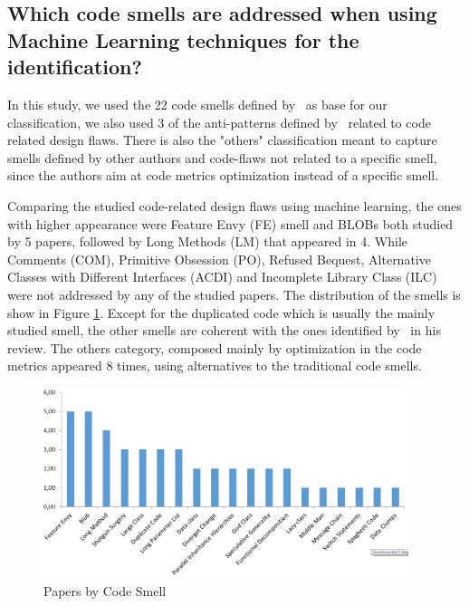 \subsection{Which code smells are addressed when using Machine Learning techniques for the identification?}

In this study, we used the 22 code smells defined by~\cite{fowler1999refactoring} as base for our classification, we also used 3 of the anti-patterns defined by~\citep{brown1998antipatterns} related to code related design flaws. There is also the "others" classification meant to capture smells defined by other authors and code-flaws not related to a specific smell, since the authors aim at code metrics optimization instead of a specific smell.

Comparing the studied code-related design flaws using machine learning, the ones with higher appearance were Feature Envy (FE) smell and BLOBs both studied by 5 papers, followed by Long Methods (LM) that appeared in 4. While Comments (COM), Primitive Obsession (PO), Refused Bequest, Alternative Classes with Different Interfaces (ACDI) and Incomplete Library Class (ILC) were not addressed by any of the studied papers. The distribution of the smells is show in Figure \ref{fig:papersBySmell}. Except for the duplicated code which is usually the mainly studied smell, the other smells are coherent with the ones identified by~\cite{zhang2011code} in his review. The others category, composed mainly by optimization in the code metrics appeared 8 times, using alternatives to the traditional code smells. %

\begin{figure}[!ht] 
    \centering
	\caption{Papers by Code Smell}
	\label{fig:papersBySmell}
	\includegraphics[width=0.95\textwidth]{imagens/papersBySmell.png}
\end{figure}


